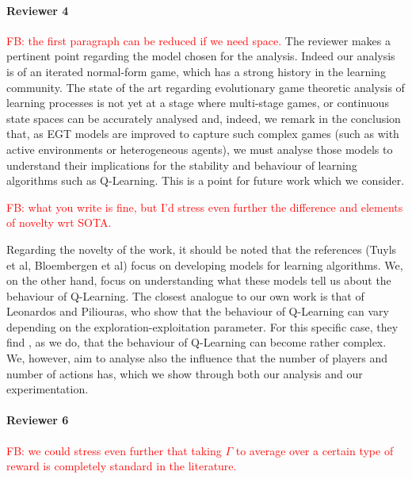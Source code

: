 \documentclass{article}
\newcommand\fb[1]{\textcolor{red}{FB: #1}}
\begin{document}
\paragraph{Reviewer 4} %
\label{par:reviewer_4}

\fb{the first paragraph can be reduced if we need space.}
The reviewer makes a pertinent point regarding the model chosen for the analysis. Indeed our
analysis is of an iterated normal-form game, which has a strong history in the learning community.
The state of the art regarding evolutionary game theoretic analysis of learning processes is not yet
at a stage where multi-stage games, or continuous state spaces can be accurately analysed and,
indeed, we remark in the conclusion that, as EGT models are improved to capture such complex games 
(such as with active environments or heterogeneous agents), we must analyse those models to
understand their implications for the stability and behaviour of learning algorithms such as
Q-Learning. This is a point for future work which we consider.

\fb{what you write is fine, but I'd stress even further the difference and elements of novelty wrt SOTA.}

Regarding the novelty of the work, it should be noted that the references (Tuyls et al,
Bloembergen et al) focus on developing models for learning algorithms. We, on the other hand, focus
on understanding what these models tell us about the behaviour of Q-Learning. The closest analogue
to our own work is that of Leonardos and Piliouras, who show that the behaviour of Q-Learning can
vary
depending on the exploration-exploitation parameter. For this specific case, they find , as we do,
that the behaviour of Q-Learning can become rather complex. We, however, aim to analyse also the
influence that the number of players and number of actions has, which we show through both our
analysis and our experimentation.


\paragraph{Reviewer 6} %
\label{par:reviewer_6}

\fb{we could stress even further that taking $\Gamma$ to average over a certain type of reward is completely standard in the literature.}
\end{document}
